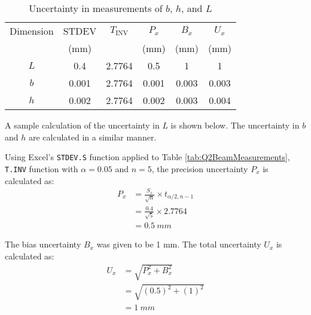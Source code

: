 \FloatBarrier
\section{}

\begin{table}[h]
    \centering
    \caption{Uncertainty in measurements of $b$, $h$, and $L$}
    \label{tab:Q4Uncertainty}
    \begin{tabular}{cccccc}
        \toprule
        Dimension & STDEV & $T_{\text{INV}}$ & $P_x$ & $B_x$ & $U_x$ \\
        & (mm) & & (mm) & (mm) & (mm) \\
        \midrule
        $L$ & 0.4 & 2.7764 & 0.5 & 1 & 1 \\
        $b$ & 0.001 & 2.7764 & 0.001 & 0.003 & 0.003 \\
        $h$ & 0.002 & 2.7764 & 0.002 & 0.003 & 0.004 \\
        \bottomrule
    \end{tabular}
\end{table}

A sample calculation of the uncertainty in $L$ is shown below. The uncertainty in $b$ and $h$ are calculated in a similar manner.

Using Excel's \texttt{STDEV.S} function applied to Table \ref{tab:Q2BeamMeasurements}, \texttt{T.INV} function with $\alpha = 0.05$ and $n = 5$, 
the precision uncertainty $P_x$ is calculated as:
\begin{align*}
    P_x &= \frac{S_x}{\sqrt{n}} \times t_{\alpha/2, n-1} \\
    &= \frac{0.4}{\sqrt{5}} \times 2.7764 \\
    &= \qty{0.5}{mm}
\end{align*}

The bias uncertainty $B_x$ was given to be 1 mm. The total uncertainty $U_x$ is calculated as:
\begin{align*}
    U_x &= \sqrt{P_x^2 + B_x^2} \\
    &= \sqrt{(0.5)^2 + (1)^2} \\
    &= \boxed{\qty{1}{mm}}
\end{align*}



